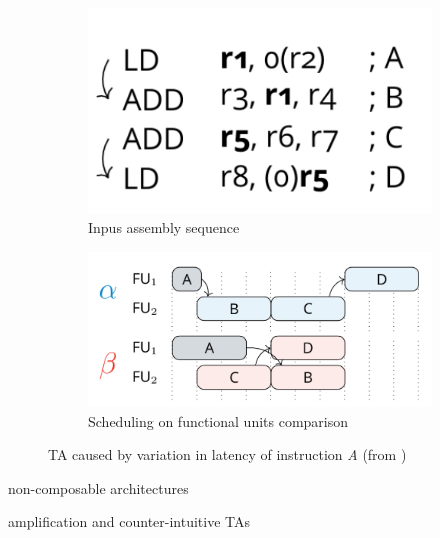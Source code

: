 \begin{figure}[htbp]
    \centering
    \begin{subfigure}[t]{0.3\textwidth}
        \centering
        \includegraphics[width=\textwidth]{figures/first-TA-ex-input.png}
        \caption{Inpus assembly sequence}
        \label{fig:TA1-code}
    \end{subfigure}
    \hfill
    \begin{subfigure}[t]{0.55\textwidth}
        \centering
        \includegraphics[width=\textwidth]{figures/first-TA-ex-trace.png}
        \caption{Scheduling on functional units comparison}
        \label{fig:TA1-trace}
    \end{subfigure}
    \caption{TA caused by variation in latency of instruction \textit{A} (from \cite{binder_definitions_2022})}
    \label{fig:TA1}
\end{figure}


non-composable architectures

amplification and counter-intuitive TAs